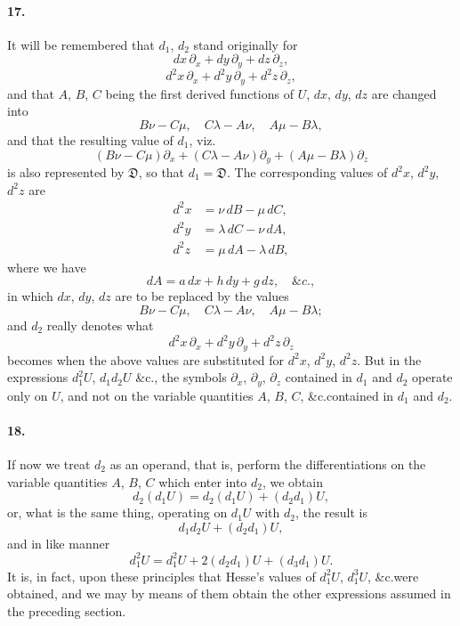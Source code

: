 \documentclass[11pt,a4paper]{book}
\begin{document}
\paragraph{17.}
It  will  be  remembered  that  $d_1$,  $d_2$  stand  originally  for
\[
dx\, \partial_x + dy\, \partial_y + dz\, \partial_z,
\]
\[
d^2x\, \partial_x + d^2y\, \partial_y + d^2z\, \partial_z,
\]
and  that  $A$,  $B$,  $C$  being  the  first  derived  functions  of  $U$,  $dx$,  $dy$,  $dz$  are  changed  into
\[
B\nu - C\mu, \quad C\lambda - A\nu, \quad A\mu - B\lambda,
\]
and  that  the  resulting  value  of  $d_1$,  viz.
\[
(B\nu - C\mu) \partial_x + (C\lambda - A\nu) \partial_y + (A\mu - B\lambda) \partial_z
\]
is  also  represented  by  $\mathfrak{D}$,  so  that  $d_1 = \mathfrak{D}$.     The  corresponding  values  of  $d^2x$,  $d^2y$,  $d^2z$  are
\begin{align*}
d^2x &= \nu\, dB - \mu\, dC, \\
d^2y &= \lambda\, dC - \nu\, dA, \\
d^2z &= \mu\, dA - \lambda\, dB,
\end{align*}
where  we  have
\[
dA = a\, dx + h\, dy + g\, dz, \quad \&c.,
\]
in  which  $dx$,  $dy$,  $dz$  are  to  be  replaced  by  the  values
\[
B\nu - C\mu, \quad C\lambda - A\nu, \quad A\mu - B\lambda;
\]
and  $d_2$  really  denotes  what
\[
d^2x\, \partial_x + d^2y\, \partial_y + d^2z\, \partial_z
\]
becomes  when  the  above  values  are  substituted  for  $d^2x$,  $d^2y$,  $d^2z$.  But  in  the  expressions
$d_1^2 U$,  $d_1 d_2 U$  \&c.,  the  symbols  $\partial_x$,  $\partial_y$,  $\partial_z$  contained  in  $d_1$  and  $d_2$  operate  only  on  $U$,  and
not  on  the  variable  quantities  $A$,  $B$,  $C$,  \&c.\@  contained  in  $d_1$  and  $d_2$.


\paragraph{18.}
If  now  we  treat  $d_2$  as  an  operand,  that  is,  perform  the  differentiations  on  the
variable  quantities  $A$,  $B$,  $C$  which  enter  into  $d_2$,  we  obtain
\[
d_2(d_1 U) = d_2(d_1 U) + (d_2 d_1)U,
\]
or,  what  is  the  same  thing,  operating  on  $d_1 U$  with  $d_2$,  the  result  is
\[
d_1 d_2 U + (d_2 d_1)U,
\]
and  in  like  manner
\[
d_1^2 U = d_1^2 U + 2(d_2 d_1)U + (d_3 d_1)U.
\]
It  is,  in  fact,  upon  these  principles  that  Hesse's  values  of  $d_1^2 U$,  $d_1^3 U$,  \&c.\@  were  obtained,
and  we  may  by  means  of  them  obtain  the  other  expressions  assumed  in  the  preceding
section.
\end{document}
